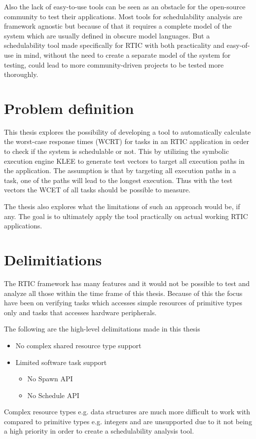 Also the lack of easy-to-use tools can be seen as an obstacle for the
open-source community to test their applications. Most tools for schedulability
analysis are framework agnostic but because of that it requires a complete
model of the system which are usually defined in obscure model languages. But a
schedulability tool made specifically for RTIC with both practicality and
easy-of-use in mind, without the need to create a separate model of the system
for testing, could lead to more community-driven projects to be tested more
thoroughly.

\section{Problem definition}
This thesis explores the possibility of developing a tool to automatically
calculate the worst-case response times (WCRT) for tasks in an RTIC application
in order to check if the system is schedulable or not. This by utilizing the
symbolic execution engine KLEE to generate test vectors to target all execution
paths in the application. The assumption is that by targeting all execution
paths in a task, one of the paths will lead to the longest execution. Thus
with the test vectors the WCET of all tasks should be possible to measure.

The thesis also explores what the limitations of such an approach would be, if
any. The goal is to ultimately apply the tool practically on actual working
RTIC applications.

\section{Delimitiations}
The RTIC framework has many features and it would not be possible to test and
analyze all those within the time frame of this thesis. Because of this the
focus have been on verifying tasks which accesses simple resources of primitive
types only and tasks that accesses hardware peripherals.

The following are the high-level delimitations made in this thesis
\begin{itemize}
    \item No complex shared resource type support
    \item Limited software task support
    \begin{itemize}
        \item No Spawn API
        \item No Schedule API
    \end{itemize}
\end{itemize}
Complex resource types e.g. data structures are much more difficult to work
with compared to primitive types e.g. integers and are unsupported due to it
not being a high priority in order to create a schedulability analysis tool.

